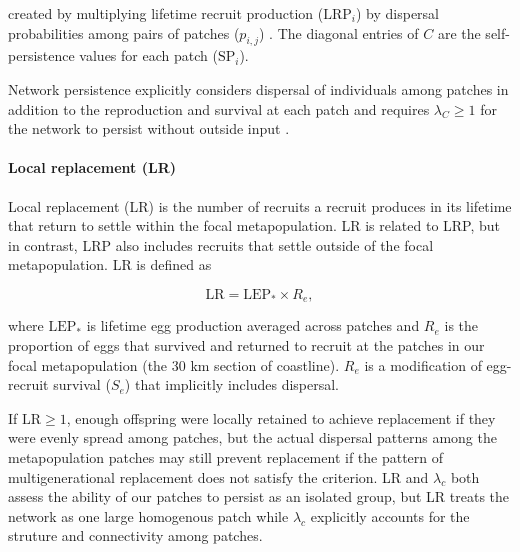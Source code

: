 \documentclass[12pt, oneside]{article}   	%
\begin{document}
created by multiplying lifetime recruit production ($\text{LRP}_i$) by dispersal probabilities among pairs of patches ($p_{i,j}$) \citep{burgess2014beyond}. The diagonal entries of $C$ are the self-persistence values for each patch ($\text{SP}_i$).

Network persistence explicitly considers dispersal of individuals among patches in addition to the reproduction and survival at each patch and requires $\lambda_C \geq 1$ for the network to persist without outside input \citep{hastings_persistence_2006, white_population_2010, burgess2014beyond}.

\paragraph*{Local replacement (LR)}

Local replacement (LR) is the number of recruits a recruit produces in its lifetime that return to settle within the focal metapopulation. LR is related to LRP, but in contrast, LRP also includes recruits that settle outside of the focal metapopulation. LR is defined as 

\begin{equation}
\text{LR} = \text{LEP}_* \times R_e, \label{EQN_LR}
\end{equation}

where $\text{LEP}_*$ is lifetime egg production averaged across patches and $R_e$ is the proportion of eggs that survived and returned to recruit at the patches in our focal metapopulation (the 30 km section of coastline). $R_e$ is a modification of egg-recruit survival ($S_e$) that implicitly includes dispersal. 

If $\text{LR} \geq 1$, enough offspring were locally retained to achieve replacement if they were evenly spread among patches, but the actual dispersal patterns among the metapopulation patches may still prevent replacement if the pattern of multigenerational replacement does not satisfy the \cite{hastings_persistence_2006} criterion. LR and $\lambda_c$ both assess the ability of our patches to persist as an isolated group, but LR treats the network as one large homogenous patch while $\lambda_c$ explicitly accounts for the struture and connectivity among patches.  
\end{document}
